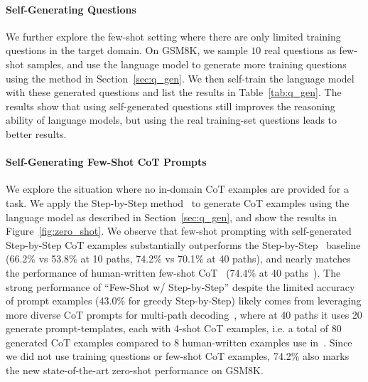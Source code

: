 
\paragraph{Self-Generating Questions}
We further explore the few-shot setting where there are only limited training questions in the target domain. On GSM8K, we sample $10$ real questions as few-shot samples, and use the language model to generate more training questions using the method in Section~\ref{sec:q_gen}. We then self-train the language model with these generated questions and list the results in Table~\ref{tab:q_gen}. The results show that using self-generated questions still improves the reasoning ability of language models, but using the real training-set questions leads to better results.


\paragraph{Self-Generating Few-Shot CoT Prompts}

We explore the situation where no in-domain CoT examples are provided for a task. We apply the Step-by-Step method~\citep{step_by_step} to generate CoT examples using the language model as described in Section~\ref{sec:q_gen}, and show the results in Figure~\ref{fig:zero_shot}. We observe that few-shot prompting with self-generated Step-by-Step CoT examples substantially outperforms the Step-by-Step~\citep{step_by_step} baseline (66.2\% vs 53.8\% at 10 paths, 74.2\% vs 70.1\% at 40 paths), and nearly matches the performance of human-written few-shot CoT~\citep{wei2021finetuned} (74.4\% at 40 paths~\citep{Wang2022SelfConsistencyIC}). The strong performance of ``Few-Shot w/ Step-by-Step'' despite the limited accuracy of prompt examples (43.0\% for greedy Step-by-Step) likely comes from leveraging more diverse CoT prompts for multi-path decoding~\citep{Li2022OnTA}, where at 40 paths it uses 20 generate prompt-templates, each with 4-shot CoT examples, i.e. a total of 80 generated CoT examples compared to 8 human-written examples use in~\citet{Wei2022ChainOT}. Since we did not use training questions or few-shot CoT examples, 74.2\% also marks the new state-of-the-art zero-shot performance on GSM8K.

